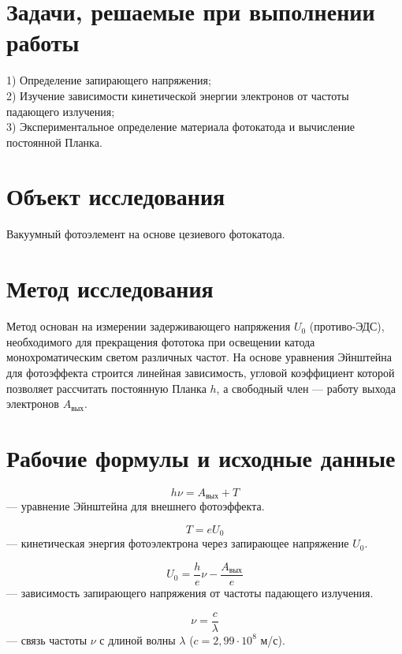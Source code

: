 \documentclass[a4paper,12pt]{article}
\begin{document}
\section{Задачи, решаемые при выполнении работы}
1) Определение запирающего напряжения; \\
2) Изучение зависимости кинетической энергии электронов от частоты падающего излучения; \\
3) Экспериментальное определение материала фотокатода и вычисление постоянной Планка.

\section{Объект исследования}
Вакуумный фотоэлемент на основе цезиевого фотокатода.

\section{Метод исследования}
Метод основан на измерении задерживающего напряжения $U_0$ (противо-ЭДС), необходимого для прекращения фототока при освещении катода монохроматическим светом различных частот. На основе уравнения Эйнштейна для фотоэффекта строится линейная зависимость, угловой коэффициент которой позволяет рассчитать постоянную Планка $h$, а свободный член — работу выхода электронов $A_{\text{вых}}$.

\section{Рабочие формулы и исходные данные}

\begin{equation}
h\nu = A_{\text{вых}} + T \tag{1}
\end{equation}
— уравнение Эйнштейна для внешнего фотоэффекта.

\begin{equation}
T = eU_0 \tag{2}
\end{equation}
— кинетическая энергия фотоэлектрона через запирающее напряжение $U_0$.

\begin{equation}
U_0 = \frac{h}{e}\nu - \frac{A_{\text{вых}}}{e} \tag{3}
\end{equation}
— зависимость запирающего напряжения от частоты падающего излучения.

\begin{equation}
\nu = \frac{c}{\lambda} \tag{4}
\end{equation}
— связь частоты $\nu$ с длиной волны $\lambda$ ($c = 2{,}99 \cdot 10^8$ м/с).
\end{document}
